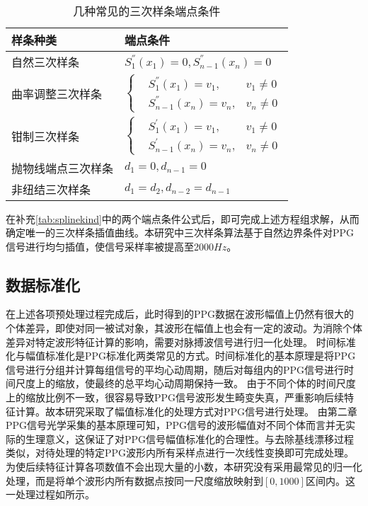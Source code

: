 \begin{table}[htbp]
    \centering
    \caption{\label{tab:splinekind}几种常见的三次样条端点条件}
    \begin{tabularx}{\linewidth}{X<{\centering}X<{\centering}}
        \toprule 
        \textbf{样条种类}&\textbf{端点条件}\\
        \midrule 
        自然三次样条&
        $
            S_{1}^{''}(x_{1})=0,
            S_{n-1}^{''}(x_{n})=0
        $
        \\
        曲率调整三次样条&
        $\left \{
        \begin{aligned}
            &S_{1}^{''}(x_{1})=v_1,&v_{1}\neq0\\
            &S_{n-1}^{''}(x_{n})=v_n,&v_{n}\neq0
        \end{aligned}
        \right.
        $
        \\
        钳制三次样条&
        $\left \{
        \begin{aligned}
            &S_{1}^{'}(x_{1})=v_1,&v_{1}\neq0\\
            &S_{n-1}^{'}(x_{n})=v_n,&v_{n}\neq0
        \end{aligned}
        \right.
        $
        \\
        抛物线端点三次样条&
        $
            d_1=0,d_{n-1}=0
        $
        \\
        非纽结三次样条&
        $
            d_1=d_2, d_{n-2}=d_{n-1}
        $
        \\
        \bottomrule
    \end{tabularx}
\end{table}

在补充\autoref{tab:splinekind}中的两个端点条件公式后，即可完成上述方程组求解，从而确定唯一的三次样条插值曲线。本研究中三次样条算法基于自然边界条件对PPG信号进行均匀插值\cite{ttk2021}，使信号采样率被提高至2000$Hz$。
\subsection{数据标准化}
在上述各项预处理过程完成后，此时得到的PPG数据在波形幅值上仍然有很大的个体差异，即使对同一被试对象，其波形在幅值上也会有一定的波动。为消除个体差异对特定波形特征计算的影响，需要对脉搏波信号进行归一化处理。
时间标准化与幅值标准化是PPG标准化两类常见的方式\cite{mmt}。时间标准化的基本原理是将PPG信号进行分组并计算每组信号的平均心动周期，随后对每组内的PPG信号进行时间尺度上的缩放，使最终的总平均心动周期保持一致。
由于不同个体的时间尺度上的缩放比例不一致，很容易导致PPG信号波形发生畸变失真，严重影响后续特征计算。故本研究采取了幅值标准化的处理方式对PPG信号进行处理。
由第二章PPG信号光学采集的基本原理可知，PPG信号的波形幅值对不同个体而言并无实际的生理意义，这保证了对PPG信号幅值标准化的合理性。与去除基线漂移过程类似，对待处理的特定PPG波形内所有采样点进行一次线性变换即可完成处理。
为使后续特征计算各项数值不会出现大量的小数，本研究没有采用最常见的归一化处理，而是将单个波形内所有数据点按同一尺度缩放映射到$[0,1000]$区间内。这一处理过程如所示。

